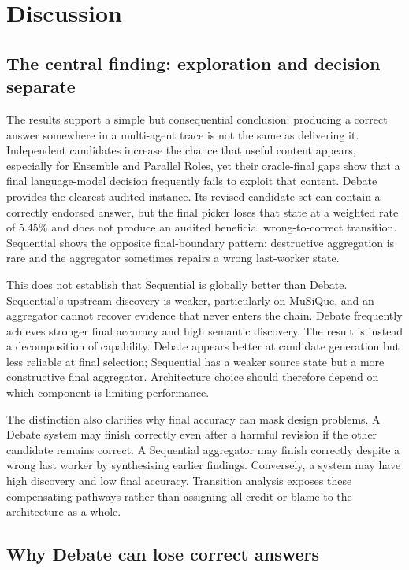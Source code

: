 \chapter{Discussion}
\label{chap:discussion}

\section{The central finding: exploration and decision separate}

The results support a simple but consequential conclusion: producing a correct answer somewhere in a multi-agent trace is not the same as delivering it. Independent candidates increase the chance that useful content appears, especially for Ensemble and Parallel Roles, yet their oracle-final gaps show that a final language-model decision frequently fails to exploit that content. Debate provides the clearest audited instance. Its revised candidate set can contain a correctly endorsed answer, but the final picker loses that state at a weighted rate of 5.45\% and does not produce an audited beneficial wrong-to-correct transition. Sequential shows the opposite final-boundary pattern: destructive aggregation is rare and the aggregator sometimes repairs a wrong last-worker state.

This does not establish that Sequential is globally better than Debate. Sequential's upstream discovery is weaker, particularly on MuSiQue, and an aggregator cannot recover evidence that never enters the chain. Debate frequently achieves stronger final accuracy and high semantic discovery. The result is instead a decomposition of capability. Debate appears better at candidate generation but less reliable at final selection; Sequential has a weaker source state but a more constructive final aggregator. Architecture choice should therefore depend on which component is limiting performance.

The distinction also clarifies why final accuracy can mask design problems. A Debate system may finish correctly even after a harmful revision if the other candidate remains correct. A Sequential aggregator may finish correctly despite a wrong last worker by synthesising earlier findings. Conversely, a system may have high discovery and low final accuracy. Transition analysis exposes these compensating pathways rather than assigning all credit or blame to the architecture as a whole.

\section{Why Debate can lose correct answers}

